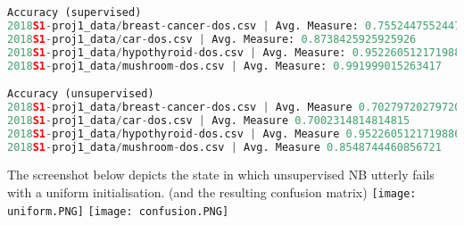 \documentclass[a4paper]{article}
\begin{document}
\begin{lstlisting}[language=Python]
Accuracy (supervised)
2018S1-proj1_data/breast-cancer-dos.csv | Avg. Measure: 0.7552447552447551
2018S1-proj1_data/car-dos.csv | Avg. Measure: 0.8738425925925926
2018S1-proj1_data/hypothyroid-dos.csv | Avg. Measure: 0.9522605121719886
2018S1-proj1_data/mushroom-dos.csv | Avg. Measure: 0.991999015263417

Accuracy (unsupervised)
2018S1-proj1_data/breast-cancer-dos.csv | Avg. Measure 0.7027972027972028
2018S1-proj1_data/car-dos.csv | Avg. Measure 0.7002314814814815
2018S1-proj1_data/hypothyroid-dos.csv | Avg. Measure 0.9522605121719886
2018S1-proj1_data/mushroom-dos.csv | Avg. Measure 0.8548744460856721
\end{lstlisting}

The screenshot below depicts the state in which unsupervised NB utterly fails with a uniform initialisation. (and the resulting confusion matrix)
\newline
\newline
\texttt{[image: uniform.PNG]}
\newline
\texttt{[image: confusion.PNG]}

\newpage
\end{document}
